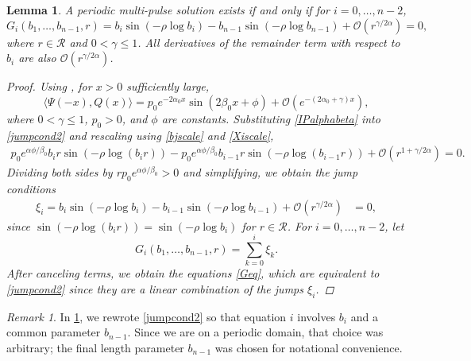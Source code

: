\documentclass[12pt]{elsarticle}
\theoremstyle{plain}
\newtheorem{lemma}[theorem]{Lemma}
\theoremstyle{definition}
\theoremstyle{remark}
\newtheorem{remark}[theorem]{Remark}
\numberwithin{theorem}{section}
\numberwithin{equation}{section}
\begin{document}
\begin{lemma}\label{jumplemma3}
A periodic multi-pulse solution exists if and only if for $i = 0, \dots, n-2$,
\begin{equation}\label{Geq}
G_i(b_1, \dots, b_{n-1}, r) = b_i \sin \left( -\rho \log b_i \right) - b_{n-1} \sin \left( -\rho \log b_{n-1} \right) + \mathcal{O}(r^{\gamma / 2 \alpha}) = 0,
\end{equation}
where $r \in \mathcal{R}$ and $0 < \gamma \leq 1$. All derivatives of the remainder term with respect to $b_i$ are also $\mathcal{O}(r^{\gamma / 2 \alpha})$. 
\begin{proof}
Using \cite[Lemma 6.1(i)]{Sandstede1998}, for $x > 0$ sufficiently large,
\begin{equation}\label{IPalphabeta}
\langle \Psi(-x), Q(x) \rangle
= p_0 e^{-2 \alpha_0 x} \sin(2 \beta_0 x + \phi) + \mathcal{O}\left(e^{-(2 \alpha_0 + \gamma) x}\right),
\end{equation}
where $0 < \gamma \leq 1$, $p_0 > 0$, and $\phi$ are constants. Substituting \cref{IPalphabeta} into \cref{jumpcond2} and rescaling using \cref{bjscale} and \cref{Xiscale},
\begin{equation}\label{diff2}
\begin{aligned}
p_0 e^{\alpha \phi / \beta_0 } b_i r \sin \left( - \rho \log (b_i r) \right) 
- p_0 e^{\alpha \phi / \beta_0 } b_{i-1} r \sin \left( -\rho \log (b_{i-1} r) \right) + \mathcal{O}(r^{1 + \gamma / 2 \alpha}) = 0.
\end{aligned}
\end{equation}
Dividing both sides by $r p_0 e^{\alpha \phi / \beta_0 } > 0$ and simplifying, we obtain the jump conditions
\begin{align}\label{diff3}
\xi_i = b_i \sin \left( -\rho \log b_i \right) - b_{i-1} \sin \left( -\rho \log b_{i-1} \right) + \mathcal{O}(r^{\gamma / 2 \alpha}) &= 0,
\end{align} 
since $\sin \left( -\rho \log (b_i r) \right) = \sin \left( -\rho \log b_i \right)$ for $r \in \mathcal{R}$. For $i = 0, \dots, n-2$, let
\begin{equation}\label{Gidef}
G_i(b_1, \dots, b_{n-1}, r) = \sum_{k = 0}^i \xi_k.
\end{equation}
After canceling terms, we obtain the equations \cref{Geq}, which are equivalent to \cref{jumpcond2} since they are a linear combination of the jumps $\xi_i$.
\end{proof}
\end{lemma}

\begin{remark}
In \cref{jumplemma3}, we rewrote \cref{jumpcond2} so that equation $i$ involves $b_i$ and a common parameter $b_{n-1}$. Since we are on a periodic domain, that choice was arbitrary;  the final length parameter $b_{n-1}$ was chosen for notational convenience.
\end{remark}
\end{document}
